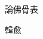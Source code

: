 \documentclass{ctexart}
\begin{document}
\begin{center}
        論佛骨表
\end{center}

\begin{center}
        韓愈
\end{center}


\end{document}
